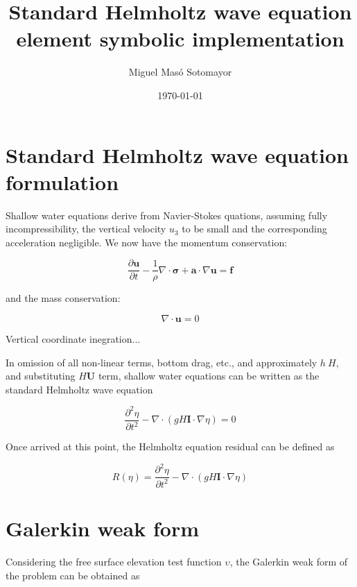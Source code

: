 \documentclass[a4paper,12pt]{article}
\title{Standard Helmholtz wave equation element symbolic implementation}
\author{Miguel Masó Sotomayor}
\date{\today}
\begin{document}
\maketitle



\section{Standard Helmholtz wave equation formulation}

Shallow water equations derive from Navier-Stokes quations, assuming fully incompressibility, the vertical velocity $u_{3}$ to be small and the corresponding acceleration negligible. We now have the momentum conservation:

\begin{equation}
\frac{\partial\mathbf{u}}{\partial t} - 
\frac{1}{\rho}\nabla\cdot\mathbf{\sigma} + 
\mathbf{a}\cdot\nabla\mathbf{u} = 
\mathbf{f}
\end{equation}

and the mass conservation:

\begin{equation}
\nabla\cdot\mathbf{u} = 0
\end{equation}

Vertical coordinate inegration...

In omission of all non-linear terms, bottom drag, etc., and approximately $h~H$, and substituting $H\mathbf{U}$ term, shallow water equations can be written as the standard Helmholtz wave equation

\begin{equation}
\frac{\partial^{2}\eta}{\partial t^{2}} - 
\nabla\cdot\left(
	gH\mathbf{I}\cdot\nabla\eta
\right) = 0
\end{equation} 

Once arrived at this point, the Helmholtz equation residual can be defined as

\begin{equation}
R\left(\eta	\right) = 
\frac{\partial^{2}\eta}{\partial t^{2}} - 
\nabla\cdot\left(
	gH\mathbf{I}\cdot\nabla\eta
\right)
\end{equation}



\section{Galerkin weak form}

Considering the free surface elevation test function $\upsilon$, the
Galerkin weak form of the problem can be obtained as
\end{document}
